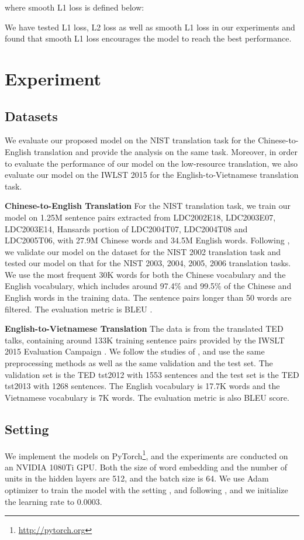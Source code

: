\documentclass[11pt]{article}
\begin{document}
\begin{CJK}{UTF8}{gbsn}
where smooth L1 loss is defined below:


We have tested L1 loss, L2 loss as well as smooth L1 loss in our experiments and found that smooth L1 loss encourages the model to reach the best performance.

\section{Experiment}

\subsection{Datasets}
We evaluate our proposed model on the NIST translation task for the Chinese-to-English translation and provide the analysis on the same task. Moreover, in order to evaluate the performance of our model on the low-resource translation, we also evaluate our model on the IWLST 2015 \citep{2015iwslt} for the English-to-Vietnamese translation task.

\textbf{Chinese-to-English Translation} For the NIST translation task, we train our model on 1.25M sentence pairs extracted from LDC2002E18, LDC2003E07, LDC2003E14, Hansards portion of LDC2004T07, LDC2004T08 and LDC2005T06, with 27.9M Chinese words and 34.5M English words. Following \citet{memdec}, we validate our model on the dataset for the NIST 2002 translation task and tested our model on that for the NIST 2003, 2004, 2005, 2006 translation tasks. We use the most frequent 30K words for both the Chinese vocabulary and the English vocabulary, which includes around 97.4\% and 99.5\% of the Chinese and English words in the training data. The sentence pairs longer than 50 words are filtered. The evaluation metric is BLEU \citep{bleu}.


\textbf{English-to-Vietnamese Translation} The data is from the translated TED talks, containing around 133K training sentence pairs provided by the IWSLT 2015 Evaluation Campaign \citep{2015iwslt}. We follow the studies of \citet{nplm}, and use the same preprocessing methods as well as the same validation and the test set. The validation set is the TED tst2012 with 1553 sentences and the test set is the TED tst2013 with 1268 sentences. The English vocabulary is 17.7K words and the Vietnamese vocabulary is 7K words. The evaluation metric is also BLEU score.


\subsection{Setting}
We implement the models on PyTorch\footnote{\url{http://pytorch.org}}, and the experiments are conducted on an NVIDIA 1080Ti GPU. Both the size of word embedding and the number of units in the hidden layers are 512, and the batch size is 64. We use Adam optimizer \citep{KingmaBa2014} to train the model with the setting ,  and  following \citet{googleattention}, and we initialize the learning rate to 0.0003. 


\end{CJK}
\end{document}
